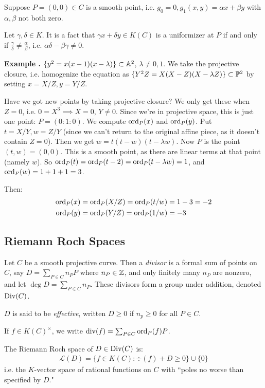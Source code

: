 \documentclass[10pt,a4paper]{article}
\begin{document}
Suppose $P = (0, 0) \in C$ is a smooth point, i.e. $g_0 = 0, g_1(x, y) = \alpha x + \beta y$ with $\alpha, \beta$ not both zero.

Let $\gamma, \delta \in K$. It is a fact that $\gamma x + \delta y \in K(C)$ is a uniformizer at $P$ if and only if $\frac{\gamma}{\delta} \neq \frac{\alpha}{\beta}$, i.e. $\alpha\delta-\beta\gamma \neq 0.$

\textbf{Example \thetheorem.} $\{y^2 = x(x-1)(x-\lambda)\}\subset\A^2$, $\lambda \neq 0, 1$. We take the projective closure, i.e. homogenize the equation as $\{Y^2Z = X(X-Z)(X-\lambda Z)\}\subset \P^2$ by setting $x = X/Z, y = Y/Z$.

Have we got new points by taking projective closure? We only get these when $Z = 0$, i.e. $0 = X^3 \implies X = 0$, $Y\neq 0$. Since we're in projective space, this is just one point: $P = (0:1:0)$. We compute $\ord_P(x)$ and $\ord_P(y)$. Put $t = X/Y, w = Z/Y$ (since we can't return to the original affine piece, as it doesn't contain $Z=0$). Then we get $w = t(t-w)(t-\lambda w)$. Now $P$ is the point $(t,w) = (0,0)$. This is a smooth point, as there are linear terms at that point (namely $w$). So $\ord_P(t) = \ord_P(t-2) = \ord_P(t-\lambda w) = 1$, and $\ord_P(w) = 1+1+1 = 3$.

Then:
\begin{align*}
  \ord_P(x) &= \ord_P(X/Z) = \ord_P(t/w) = 1-3 = -2\\
  \ord_P(y) &= \ord_P(Y/Z) = \ord_P(1/w) = -3
\end{align*}

\subsection{Riemann Roch Spaces}
Let $C$ be a smooth projective curve. Then a \emph{divisor} is a formal sum of points on $C$, say $D = \sum_{P \in C} n_P P$ where $n_P \in \Z$, and only finitely many $n_P$ are nonzero, and let $\deg D = \sum_{P \in C} n_P$. These divisors form a group under addition, denoted $\Div(C)$.

$D$ is said to be \emph{effective}, written $D \geq 0$ if $n_p \geq 0$ for all $P \in C$.

If $f \in K(C)^\times$, we write $\div(f) = \sum_{P \in C} \ord_P(f) P$.

The Riemann Roch space of $D \in \Div(C)$ is:
\begin{align*}
  \mathscr{L}(D) = \{f \in K(C) : \div(f) + D \geq 0\}\cup\{0\}
\end{align*}
i.e. the $K$-vector space of rational functions on $C$ with ``poles no worse than specified by $D$."
\end{document}
